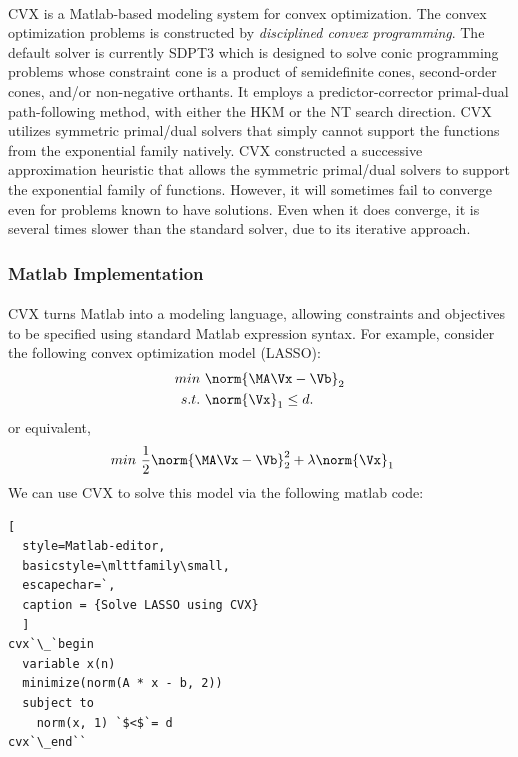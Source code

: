 \documentclass[
10pt, %
a4paper, %
oneside, %
headinclude,footinclude, %
BCOR5mm, %
]{scrartcl}
\begin{document}
\paragraph{}
CVX is a Matlab-based modeling system for convex 
optimization. The convex optimization problems is constructed by 
\textit{disciplined convex 	programming}. The default solver is currently SDPT3 
\cite{toh1999sdpt3} which is designed to solve conic programming problems whose 
constraint cone is a product of semidefinite cones, second-order cones, and/or 
non-negative orthants. It employs a predictor-corrector primal-dual 
path-following method, with either the HKM or the NT search direction.
CVX utilizes symmetric primal/dual solvers that simply cannot support the 
functions from the exponential family natively. CVX constructed a successive 
approximation heuristic that allows the symmetric primal/dual solvers to support 
the exponential family of functions. However, it will sometimes fail to 
converge even for problems known to have solutions. Even when it does converge, 
it is several times slower than the standard solver, due to its iterative 
approach.

\subsubsection{Matlab Implementation}
\paragraph{}
CVX turns Matlab into a modeling language, allowing constraints 
and objectives to be specified using standard Matlab expression syntax.
For example, consider the following convex optimization model (LASSO):
\begin{align}
	min~& \norm{ \MA \Vx - \Vb }_2 	\nonumber \\
	s.t.~& \norm{ \Vx }_1 \leq d.  \nonumber 
\end{align}
or equivalent,
\begin{align} \label{eq:lasso_formulation}
	min~& \frac{1}{2} \norm{ \MA \Vx - \Vb }_2^2 + \lambda \norm{ \Vx }_1 
\end{align}
We can use CVX to solve this model via the following matlab code:

\begin{lstlisting}[
  style=Matlab-editor,
  basicstyle=\mlttfamily\small,
  escapechar=`,
  caption = {Solve LASSO using CVX}
  ]
cvx`\_`begin
  variable x(n)
  minimize(norm(A * x - b, 2))
  subject to
    norm(x, 1) `$<$`= d
cvx`\_end``
\end{lstlisting}
\end{document}
